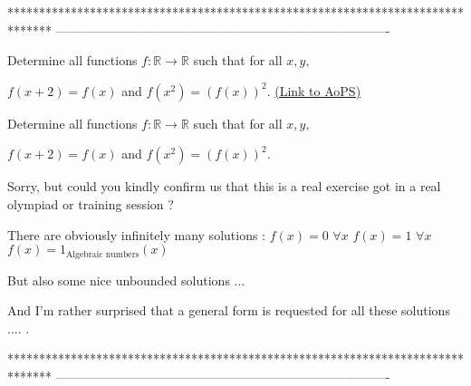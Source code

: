 *******************************************************************************
-------------------------------------------------------------------------------

\begin{problem}
	Determine all functions $f:\mathbb{R}\rightarrow\mathbb{R}$ such that for all $x, y,$

$f(x+2)=f(x)$ and $f(x^2)=(f(x))^2$.
	\flushright \href{https://artofproblemsolving.com/community/c6h579917}{(Link to AoPS)}
\end{problem}



\begin{solution}
	\begin{tcolorbox}Determine all functions $f:\mathbb{R}\rightarrow\mathbb{R}$ such that for all $x, y,$

$f(x+2)=f(x)$ and $f(x^2)=(f(x))^2$.\end{tcolorbox}
Sorry, but could you kindly confirm us that this is a real exercise got in a real olympiad or training session ?

There are obviously infinitely many solutions :
$f(x)=0$ $\forall x$
$f(x)=1$ $\forall x$
$f(x)=1_{\text{Algebraic numbers}}(x)$

But also some nice unbounded solutions ...

And I'm rather surprised that a general form is requested for all these solutions .... .
\end{solution}
*******************************************************************************
-------------------------------------------------------------------------------

